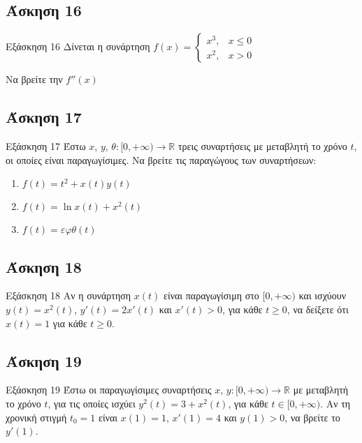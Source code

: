 \documentclass[greek]{beamer}
\begin{document}
\subsection{Άσκηση 16}
\begin{frame}[label=Άσκηση16]{Εξάσκηση 16}
 Δίνεται η συνάρτηση
 $f(x)=\begin{cases}
   x^3, & x\le 0 \\
   x^2, & x>0
  \end{cases}$

 Να βρείτε την $f''(x)$

\end{frame}

\subsection{Άσκηση 17}
\begin{frame}[label=Άσκηση17]{Εξάσκηση 17}
 Έστω $x$, $y$, $θ:[0,+\infty)\to \mathbb{R}$ τρεις συναρτήσεις με μεταβλητή το χρόνο $t$, οι οποίες είναι παραγωγίσιμες. Να βρείτε τις παραγώγους των συναρτήσεων:
 \begin{enumerate}
  \item<1-> $f(t)=t^2+x(t)y(t)$
  \item<2-> $f(t)=\ln x(t) +x^2(t)$
  \item<3-> $f(t)=εφθ(t)$
 \end{enumerate}

\end{frame}

\subsection{Άσκηση 18}
\begin{frame}[label=Άσκηση18]{Εξάσκηση 18}
 Αν η συνάρτηση $x(t)$ είναι παραγωγίσιμη στο $[0,+\infty)$ και ισχύουν $y(t)=x^2(t)$, $y'(t)=2x'(t)$ και $x'(t)>0$, για κάθε $t\ge 0$, να δείξετε ότι $x(t)=1$ για κάθε $t\ge 0$.

\end{frame}

\subsection{Άσκηση 19}
\begin{frame}[label=Άσκηση19]{Εξάσκηση 19}
 Έστω οι παραγωγίσιμες συναρτήσεις $x$, $y:[0,+\infty)\to\mathbb{R}$ με μεταβλητή το χρόνο $t$, για τις οποίες ισχύει $y^2(t)=3+x^2(t)$, για κάθε $t\in [0,+\infty )$. Αν τη χρονική στιγμή $t_0=1$ είναι $x(1)=1$, $x'(1)=4$ και $y(1)>0$, να βρείτε το $y'(1)$.

\end{frame}
\end{document}
